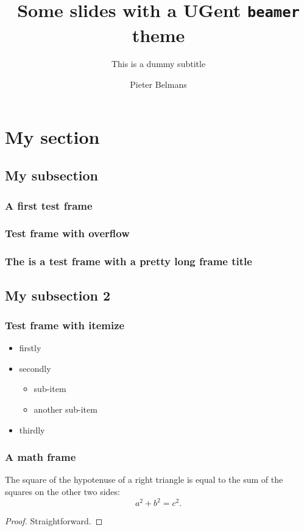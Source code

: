 \documentclass{beamer}
\title{Some slides with a UGent \texttt{beamer} theme}
\subtitle{This is a dummy subtitle}
\author{Pieter Belmans}
\begin{document}
\begin{frame}
  \titlepage
\end{frame}

\section{My section}
\subsection{My subsection}

\begin{frame}
  \frametitle{A first test frame}

  \lipsum[2]
\end{frame}

\begin{frame}
  \frametitle{Test frame with overflow}

  \lipsum[2-3]
\end{frame}

\begin{frame}
  \frametitle{The is a test frame with a pretty long frame title}

  \lipsum[2]
\end{frame}


\subsection{My subsection 2}
\begin{frame}
  \frametitle{Test frame with itemize}

  \begin{itemize}
    \item<1-> firstly
    \item<2-> secondly
      \begin{itemize}
        \item sub-item
        \item another sub-item
      \end{itemize}
    \item<3-> thirdly
  \end{itemize}
\end{frame}

\begin{frame}
  \frametitle{A math frame}
  
  \begin{theorem}[Pythagoras]
    The square of the hypotenuse of a \alert{right} triangle is equal to the sum of the squares on the other two sides:
    \[
      a^2 + b^2 = c^2.
    \]
  \end{theorem}
  \begin{proof}
    Straightforward.
  \end{proof}
\end{frame}
\end{document}
